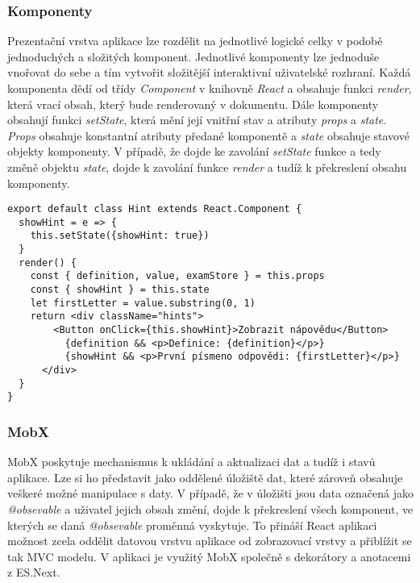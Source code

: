 \documentclass[a4paper,11pt,titlepage,fleqn]{article}
\begin{document}
        
        \subsubsection{Komponenty}
            Prezentační vrstva aplikace lze rozdělit na jednotlivé logické celky v podobě jednoduchých a složitých komponent. Jednotlivé komponenty lze jednoduše vnořovat do sebe a tím vytvořit složitější interaktivní uživatelské rozhraní. Každá komponenta dědí od třídy \textit{Component} v knihovně \textit{React} a obsahuje funkci \textit{render}, která vrací obsah, který bude renderovaný v dokumentu. Dále komponenty obsahují funkci \textit{setState}, která mění její vnitřní stav a atributy \textit{props} a \textit{state}. \textit{Props} obsahuje konstantní atributy předané komponentě a \textit{state} obsahuje stavové objekty komponenty. V případě, že dojde ke zavolání \textit{setState} funkce a tedy změně objektu \textit{state}, dojde k zavolání funkce \textit{render} a tudíž k překreslení obsahu komponenty\cite{bib:react}.

\begin{lstlisting}[language=JS, caption={Příklad komponenty pro zobrazování nápovědy při procvičování slovíček},label=code:hints]
export default class Hint extends React.Component {
  showHint = e => {
    this.setState({showHint: true})
  }
  render() {
    const { definition, value, examStore } = this.props
    const { showHint } = this.state
    let firstLetter = value.substring(0, 1)
    return <div className="hints">
        <Button onClick={this.showHint}>Zobrazit nápovědu</Button>
          {definition && <p>Definice: {definition}</p>}
          {showHint && <p>První písmeno odpovědi: {firstLetter}</p>}
      </div>
  }
}
\end{lstlisting}

        \subsubsection{MobX}
            \label{mobx}
            MobX poskytuje mechanismus k ukládání a aktualizaci dat a tudíž i stavů aplikace\cite{bib:mobx}. Lze si ho představit jako oddělené úložiště dat, které zároveň obsahuje veškeré možné manipulace s daty. V případě, že v úložišti jsou data označená jako \textit{@obsevable} a uživatel jejich obsah změní, dojde k překreslení všech komponent, ve kterých se daná \textit{@obsevable} proměnná vyskytuje. To přináší React aplikaci možnost zcela oddělit datovou vrstvu aplikace od zobrazovací vrstvy a přiblížit se tak MVC modelu. V aplikaci je využitý MobX společně s dekorátory a anotacemi z ES.Next. 
\end{document}
